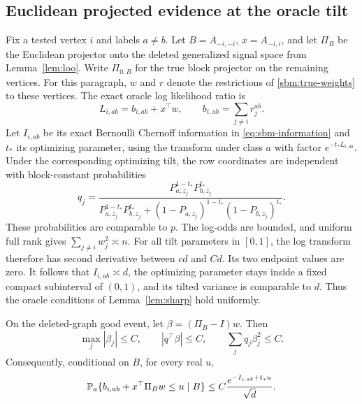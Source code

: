 \subsection{Euclidean projected evidence at the oracle tilt}
\label{sbm:tilted-section}

Fix a tested vertex $i$ and labels $a\ne b$. Let $B=A_{-i,-i}$,
$x=A_{-i,i}$, and let $\Pi_B$ be the Euclidean projector onto the
deleted generalized signal space from Lemma~\ref{lem:loo}. Write
$\Pi_{0,B}$ for the true block projector on the remaining vertices.
For this paragraph, $w$ and $r$ denote the restrictions of
\eqref{sbm:true-weights} to these vertices. The exact oracle log
likelihood ratio is
\[
 L_{i,ab}=b_{i,ab}+x^\top w,
 \qquad b_{i,ab}=\sum_{j\ne i}r_j^{ab}.
\]
Let $I_{i,ab}$ be its exact Bernoulli Chernoff information in
\eqref{eq:sbm-information} and $t_*$
its optimizing parameter, using the transform under class $a$ with
factor $e^{-t_*L_{i,ab}}$. Under the corresponding optimizing tilt,
the row coordinates are independent with block-constant probabilities
\begin{equation}
 q_j=\frac{P_{a,z_j}^{1-t_*}P_{b,z_j}^{t_*}}
 {P_{a,z_j}^{1-t_*}P_{b,z_j}^{t_*}
 +(1-P_{a,z_j})^{1-t_*}(1-P_{b,z_j})^{t_*}}.
 \label{sbm:tilted-probability}
\end{equation}
These probabilities are comparable to $p$. The log-odds are bounded,
and uniform full rank gives $\sum_{j\ne i}w_j^2\asymp n$.
For all tilt parameters in $[0,1]$, the log transform therefore has
second derivative between $cd$ and $Cd$. Its two endpoint values
are zero. It follows that $I_{i,ab}\asymp d$, the optimizing parameter
stays inside a fixed compact subinterval of $(0,1)$, and its tilted
variance is comparable to $d$. Thus the oracle conditions of
Lemma~\ref{lem:sharp} hold uniformly.

\begin{lemma}
\label{sbm:tilted-cancellation}
On the deleted-graph good event, let $\beta=(\Pi_B-I)w$. Then
\begin{equation}
 \max_j|\beta_j|\le C,
 \qquad |q^\top\beta|\le C,
 \qquad \sum_jq_j\beta_j^2\le C.
 \label{sbm:tilted-errors}
\end{equation}
Consequently, conditional on $B$, for every real $u$,
\begin{equation}
 \mathbb P_a\{b_{i,ab}+x^\top\Pi_Bw\le u\mid B\}
 \le C\frac{e^{-I_{i,ab}+t_*u}}{\sqrt d}.
 \label{sbm:conditional-tail}
\end{equation}
\end{lemma}

